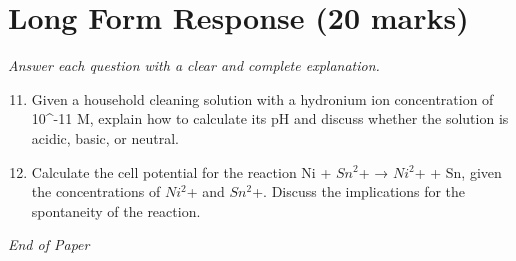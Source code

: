 \documentclass[12pt]{article}
\begin{document}
\section*{Long Form Response (20 marks)}
\textit{Answer each question with a clear and complete explanation.}
\begin{enumerate}[label=\arabic*.]
\setcounter{enumi}{10}
\item Given a household cleaning solution with a hydronium ion concentration of 10^-11 M, explain how to calculate its pH and discuss whether the solution is acidic, basic, or neutral.
\item Calculate the cell potential for the reaction Ni + $Sn^2$+ → $Ni^2$+ + Sn, given the concentrations of $Ni^2$+ and $Sn^2$+. Discuss the implications for the spontaneity of the reaction.
\end{enumerate}

\vfill
\noindent\textit{End of Paper}
\end{document}
